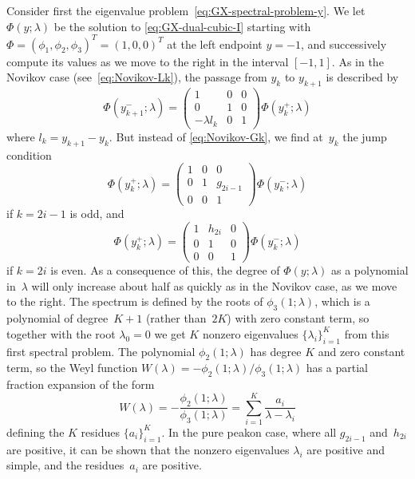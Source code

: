 \documentclass[10pt,a4paper]{article} \pdfoutput=1 
\begin{document}
Consider first the eigenvalue problem~\eqref{eq:GX-spectral-problem-y}.
We let $\Phi(y;\lambda)$ be the solution to \eqref{eq:GX-dual-cubic-I}
starting with
$\Phi = (\phi_1,\phi_2,\phi_3)^T = (1,0,0)^T$ at the left endpoint $y=-1$,
and successively compute its values as we move to the right in the interval $[-1,1]$.
As in the Novikov case (see~\eqref{eq:Novikov-Lk}),
the passage from $y_k$ to $y_{k+1}$ is described by
\begin{equation}
  \Phi(y_{k+1}^-;\lambda) =
  \begin{pmatrix}
    1 & 0 & 0 \\ 0 & 1 & 0 \\ -\lambda l_k & 0 & 1
  \end{pmatrix}
  \Phi(y_k^+;\lambda)
\end{equation}
where $l_k = y_{k+1} - y_k$.
But instead of \eqref{eq:Novikov-Gk},
we find at~$y_k$ the jump condition
\begin{equation}
  \label{eq:GX-Gi}
  \Phi(y_k^+;\lambda) =
  \begin{pmatrix}
    1 & 0 & 0 \\ 0 & 1 & g_{2i-1} \\ 0 & 0 & 1
  \end{pmatrix}
  \Phi(y_k^-;\lambda)
\end{equation}
if $k=2i-1$ is odd, and
\begin{equation}
  \label{eq:GX-Hi}
  \Phi(y_k^+;\lambda) =
  \begin{pmatrix}
    1 & h_{2i} & 0 \\ 0 & 1 & 0 \\ 0 & 0 & 1
  \end{pmatrix}
  \Phi(y_k^-;\lambda)
\end{equation}
if $k=2i$ is even.
As a consequence of this, the degree of $\Phi(y;\lambda)$ as a polynomial in~$\lambda$
will only increase about half as quickly as in the Novikov case, as we move to the right.
The spectrum is defined by the roots of $\phi_3(1;\lambda)$, which is
a polynomial of degree~$K+1$ (rather than~$2K$) with zero constant term,
so together with the root $\lambda_0=0$
we get $K$ nonzero eigenvalues $\{ \lambda_i \}_{i=1}^K$ from this first spectral problem.
The polynomial $\phi_2(1;\lambda)$ has degree $K$ and zero constant term,
so the Weyl function
$W(\lambda) = - \phi_2(1;\lambda) / \phi_3(1;\lambda)$
has a partial fraction expansion of the form
\begin{equation}
  W(\lambda)
  = - \frac{\phi_2(1;\lambda)}{\phi_3(1;\lambda)}
  = \sum_{i=1}^K \frac{a_i}{\lambda-\lambda_i}
\end{equation}
defining the $K$ residues $\{ a_i \}_{i=1}^K$.
In the pure peakon case, where all $g_{2i-1}$ and~$h_{2i}$ are positive,
it can be shown that the nonzero eigenvalues $\lambda_i$ are positive and simple,
and the residues~$a_i$ are positive.
\end{document}

